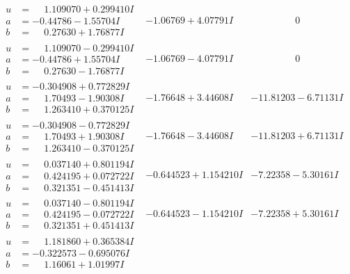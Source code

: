 \documentclass[1p]{elsarticle_modified}
\theoremstyle{definition}
\begin{document}
$$\begin{array}{c|c|c}
\begin{aligned}
u &= \phantom{-}1.109070 + 0.299410 I \\
a &= -0.44786 - 1.55704 I \\
b &= \phantom{-}0.27630 + 1.76877 I\end{aligned}
 & -1.06769 + 4.07791 I & \phantom{-0.000000 } 0 \\ \hline\begin{aligned}
u &= \phantom{-}1.109070 - 0.299410 I \\
a &= -0.44786 + 1.55704 I \\
b &= \phantom{-}0.27630 - 1.76877 I\end{aligned}
 & -1.06769 - 4.07791 I & \phantom{-0.000000 } 0 \\ \hline\begin{aligned}
u &= -0.304908 + 0.772829 I \\
a &= \phantom{-}1.70493 - 1.90308 I \\
b &= \phantom{-}1.263410 + 0.370125 I\end{aligned}
 & -1.76648 + 3.44608 I & -11.81203 - 6.71131 I \\ \hline\begin{aligned}
u &= -0.304908 - 0.772829 I \\
a &= \phantom{-}1.70493 + 1.90308 I \\
b &= \phantom{-}1.263410 - 0.370125 I\end{aligned}
 & -1.76648 - 3.44608 I & -11.81203 + 6.71131 I \\ \hline\begin{aligned}
u &= \phantom{-}0.037140 + 0.801194 I \\
a &= \phantom{-}0.424195 + 0.072722 I \\
b &= \phantom{-}0.321351 - 0.451413 I\end{aligned}
 & -0.644523 + 1.154210 I & -7.22358 - 5.30161 I \\ \hline\begin{aligned}
u &= \phantom{-}0.037140 - 0.801194 I \\
a &= \phantom{-}0.424195 - 0.072722 I \\
b &= \phantom{-}0.321351 + 0.451413 I\end{aligned}
 & -0.644523 - 1.154210 I & -7.22358 + 5.30161 I \\ \hline\begin{aligned}
u &= \phantom{-}1.181860 + 0.365384 I \\
a &= -0.322573 - 0.695076 I \\
b &= \phantom{-}1.16061 + 1.01997 I\end{aligned}

\end{array}$$
\end{document}
